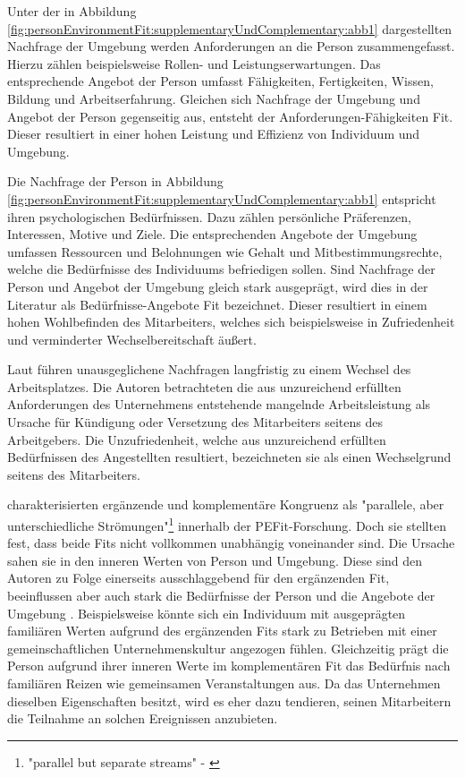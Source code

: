 Unter der in Abbildung \ref{fig:personEnvironmentFit:supplementaryUndComplementary:abb1} dargestellten Nachfrage der Umgebung werden Anforderungen an die Person zusammengefasst. Hierzu zählen beispielsweise Rollen- und Leistungserwartungen. Das entsprechende Angebot der Person umfasst Fähigkeiten, Fertigkeiten, Wissen, Bildung und Arbeitserfahrung. Gleichen sich Nachfrage der Umgebung und Angebot der Person gegenseitig aus, entsteht der Anforderungen-Fähigkeiten Fit. Dieser resultiert in einer hohen Leistung und Effizienz von Individuum und Umgebung. \cite[S. 3f.]{edwards:1991}\cite[S. 5f.]{edwards:1996}\cite[S. 4]{edwards:2007}\cite[S. 7]{su:2015}

Die Nachfrage der Person in Abbildung \ref{fig:personEnvironmentFit:supplementaryUndComplementary:abb1} entspricht ihren psychologischen Bedürfnissen. Dazu zählen persönliche Präferenzen, Interessen, Motive und Ziele. Die entsprechenden Angebote der Umgebung umfassen Ressourcen und Belohnungen wie Gehalt und Mitbestimmungsrechte, welche die Bedürfnisse des Individuums befriedigen sollen. Sind Nachfrage der Person und Angebot der Umgebung gleich stark ausgeprägt, wird dies in der Literatur als Bedürfnisse-Angebote Fit bezeichnet. Dieser resultiert in einem hohen Wohlbefinden des Mitarbeiters, welches sich beispielsweise in Zufriedenheit und verminderter Wechselbereitschaft äußert. \cite[S. 2]{edwards:2004}\cite[S. 2f.]{edwards:1996}\cite[S. 4]{edwards:2008}\cite[S. 4f.]{edwards:2007}\cite[S. 7]{su:2015}

Laut \textcite[S. 12ff.]{workAdjustment:1964} führen unausgeglichene Nachfragen langfristig zu einem Wechsel des Arbeitsplatzes. Die Autoren betrachteten die aus unzureichend erfüllten Anforderungen des Unternehmens entstehende mangelnde Arbeitsleistung als Ursache für Kündigung oder Versetzung des Mitarbeiters seitens des Arbeitgebers. Die Unzufriedenheit, welche aus unzureichend erfüllten Bedürfnissen des Angestellten resultiert, bezeichneten sie als einen Wechselgrund seitens des Mitarbeiters.

\textcite[S. 1, Z. 2]{edwards:2004} charakterisierten ergänzende und komplementäre Kongruenz als "parallele, aber unterschiedliche Strömungen"\footnote{"parallel but separate streams" - \textcite[S. 1, Z. 2]{edwards:2004}} innerhalb der \ac{PEFit}-Forschung. Doch sie stellten fest, dass beide Fits nicht vollkommen unabhängig voneinander sind. Die Ursache sahen sie in den inneren Werten von Person und Umgebung. Diese sind den Autoren zu Folge einerseits ausschlaggebend für den ergänzenden Fit, beeinflussen aber auch stark die Bedürfnisse der Person und die Angebote der Umgebung \cite[S. 3]{edwards:2004}. Beispielsweise könnte sich ein Individuum mit ausgeprägten familiären Werten aufgrund des ergänzenden Fits stark zu Betrieben mit einer gemeinschaftlichen Unternehmenskultur angezogen fühlen. Gleichzeitig prägt die Person aufgrund ihrer inneren Werte im komplementären Fit das Bedürfnis nach familiären Reizen wie gemeinsamen Veranstaltungen aus. Da das Unternehmen dieselben Eigenschaften besitzt, wird es eher dazu tendieren, seinen Mitarbeitern die Teilnahme an solchen Ereignissen anzubieten.

